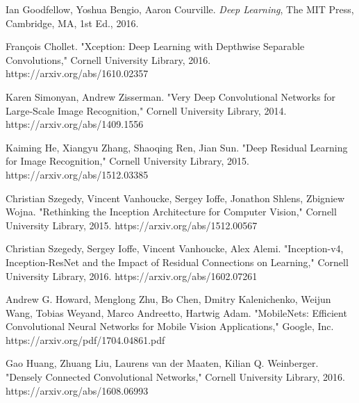 \documentclass{article}
\begin{document}
\begin{thebibliography}{99}

	Ian Goodfellow, Yoshua Bengio, Aaron Courville. 
	\textit{Deep Learning}, 
	The MIT Press, 
	Cambridge, MA, 
	1st Ed.,
	2016.
	
	François Chollet.
	"Xception: Deep Learning with Depthwise Separable Convolutions,"
	Cornell University Library,
	2016.
	https://arxiv.org/abs/1610.02357
	
	Karen Simonyan, Andrew Zisserman.
	"Very Deep Convolutional Networks for Large-Scale Image Recognition,"
	Cornell University Library,
	2014.
	https://arxiv.org/abs/1409.1556
	
	Kaiming He, Xiangyu Zhang, Shaoqing Ren, Jian Sun.
	"Deep Residual Learning for Image Recognition,"
	Cornell University Library,
	2015.
	https://arxiv.org/abs/1512.03385
	
	Christian Szegedy, Vincent Vanhoucke, Sergey Ioffe, Jonathon Shlens, Zbigniew Wojna.
	"Rethinking the Inception Architecture for Computer Vision,"
	Cornell University Library,
	2015.
	https://arxiv.org/abs/1512.00567
	
	Christian Szegedy, Sergey Ioffe, Vincent Vanhoucke, Alex Alemi.
	"Inception-v4, Inception-ResNet and the Impact of Residual Connections on Learning,"
	Cornell University Library,
	2016.
	https://arxiv.org/abs/1602.07261
	
	Andrew G. Howard, Menglong Zhu, Bo Chen, Dmitry Kalenichenko, Weijun Wang, Tobias Weyand, Marco Andreetto, Hartwig Adam.
	"MobileNets: Efficient Convolutional Neural Networks for Mobile Vision Applications,"
	Google, Inc.
	https://arxiv.org/pdf/1704.04861.pdf
	
	Gao Huang, Zhuang Liu, Laurens van der Maaten, Kilian Q. Weinberger.
	"Densely Connected Convolutional Networks,"
	Cornell University Library,
	2016.
	https://arxiv.org/abs/1608.06993

\end{thebibliography}
\end{document}
